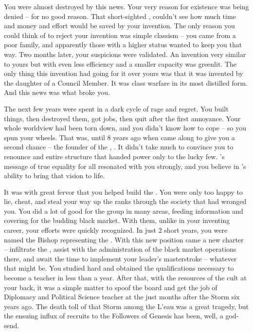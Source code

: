 \documentclass[char]{GL2020}
\begin{document}
You were almost destroyed by this news. Your very reason for existence was being denied -- for no good reason. That short-sighted \cAntiChup{\cleric}, \cAntiChup{\full} couldn't see how much time and money and effort would be saved by your invention. The only reason you could think of to reject your invention was simple classism -- you came from a poor family, and apparently those with a higher status wanted to keep you that way. Two months later, your suspicions were validated. An invention very similar to yours but with even less efficiency and a smaller capacity was greenlit. The only thing this invention had going for it over yours was that it was invented by the daughter of a Council Member. It was class warfare in its most distilled form. And this news was what broke you.

The next few years were spent in a dark cycle of rage and regret. You built things, then destroyed them, got jobs, then quit after the first annoyance. Your whole worldview had been torn down, and you didn't know how to cope -- so you spun your wheels. That was, until 8 years ago when \emph{\cChupLeader{\they}} came along to give you a second chance -- the founder of the \pGoaties{}, \cChupLeader{\full}. It didn't take much to convince you to renounce \cTechGod{} and \cTechGod{\their} entire structure that handed power only to the lucky few. \cGenesis{}'s message of true equality for all resonated with you strongly, and you believe in \cChupLeader{}'s ability to bring that vision to life. 

It was with great fervor that you helped build the \pGoaties{}. You were only too happy to lie, cheat, and steal your way up the ranks through the society that had wronged you. You did a lot of good for the group in many areas, feeding information and covering for the budding black market. With them, unlike in your inventing career, your efforts were quickly recognized. In just 2 short years, you were named the Bishop representing the \pTech{}. With this new position came a new charter -- infiltrate the \pSchool{}, assist with the administration of the black market operations there, and await the time to implement your leader's masterstroke -- whatever that might be. You studied hard and obtained the qualifications necessary to become a teacher in less than a year. After that, with the resources of the cult at your back, it was a simple matter to spoof the board and get the job of Diplomacy and Political Science teacher at the \pSc{} just months after the Storm six years ago. The death toll of that Storm among the L'eau was a great tragedy, but the ensuing influx of recruits to the Followers of Genesis has been, well, a god-send.
\end{document}
